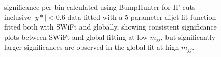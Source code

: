 \begin{figure}[!htb]
  \centering
  \caption{significance per bin calculated using BumpHunter for H' cuts inclusive $|y*|<0.6$ data fitted with a 5 parameter dijet fit function fitted both with SWiFt and globally, showing consistent significance plots between SWiFt and global fitting at low $m_{jj}$, but significantly larger significances are observed in the global fit at high $m_{jj}$.}
  \label{fig:ystar0.6FullRunBHFits}
\end{figure}



